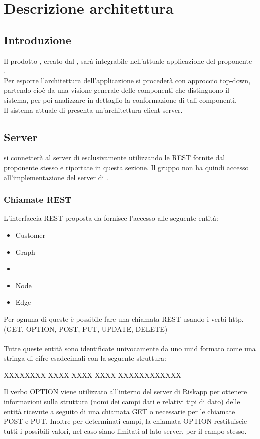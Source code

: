 \newpage

\section{Descrizione architettura}
\label{descrizione_architettura}
\subsection{Introduzione}
Il prodotto \progetto{}, creato dal  \zephyrus{}, sarà integrabile nell'attuale applicazione del proponente \riskapp{}.
\\Per esporre l'architettura dell'applicazione si procederà con approccio top-down, partendo cioè da una visione generale delle componenti che distinguono il sistema, per poi analizzare in dettaglio la conformazione di tali componenti.
\\Il sistema attuale di \riskapp{} presenta un'architettura client-server.
\subsection{Server}
\progetto{} si connetterà al server di \riskapp{} esclusivamente utilizzando le  REST fornite dal proponente stesso e riportate in questa sezione. Il gruppo non ha quindi accesso all'implementazione del server di \riskapp{}.
\subsubsection{Chiamate REST}
L'interfaccia REST proposta da \riskapp{} fornisce l'accesso alle seguente entità:
\begin{itemize}
	\item Customer
	\item Graph
	\item {}
	\item Node
	\item Edge
\end{itemize}
Per ognuna di queste è possibile fare una chiamata REST usando i verbi http. (GET, OPTION, POST, PUT, UPDATE, DELETE)\\\\
Tutte queste entità sono identificate univocamente da uno uuid formato come una stringa di cifre esadecimali con la seguente struttura:
\begin{center}
	XXXXXXXX-XXXX-XXXX-XXXX-XXXXXXXXXXXX
\end{center}
Il verbo OPTION viene utilizzato all'interno del server di Riskapp per ottenere informazioni sulla struttura (nomi dei campi dati e relativi tipi di dato) delle entità ricevute a seguito di una chiamata GET o necessarie per le chiamate POST e PUT.
Inoltre per determinati campi, la chiamata OPTION restituiscie tutti i possibili valori, nel caso siano limitati al lato server, per il campo stesso.

